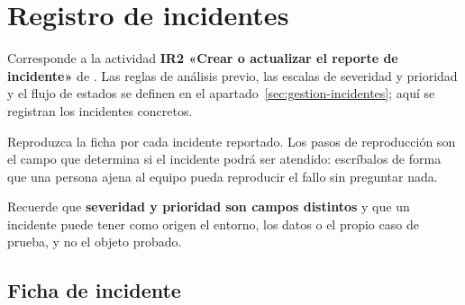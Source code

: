 \section{Registro de incidentes}
\label{anx:incidentes}

\begin{notanormativa}
Corresponde a la actividad \textbf{IR2 «Crear o actualizar el reporte de incidente»} de
. Las reglas de análisis previo, las escalas de severidad y prioridad y el flujo de
estados se definen en el apartado~\ref{sec:gestion-incidentes}; aquí se registran los
incidentes concretos.
\end{notanormativa}

\begin{observacion}
\end{observacion}

\begin{instruccion}
Reproduzca la ficha por cada incidente reportado. Los pasos de reproducción son el campo que
determina si el incidente podrá ser atendido: escríbalos de forma que una persona ajena al
equipo pueda reproducir el fallo sin preguntar nada.

Recuerde que \textbf{severidad y prioridad son campos distintos} y que un incidente puede tener
como origen el entorno, los datos o el propio caso de prueba, y no el objeto probado.
\end{instruccion}

\subsection*{Ficha de incidente}

